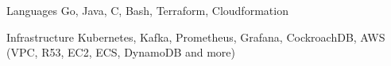 

\begin{cvskills}

  \cvskill
    {Languages} %
    {Go, Java, C, Bash, Terraform, Cloudformation} %

  \cvskill
    {Infrastructure} %
    {Kubernetes, Kafka, Prometheus, Grafana, CockroachDB, AWS (VPC, R53, EC2, ECS, DynamoDB and more)} %

\end{cvskills}
